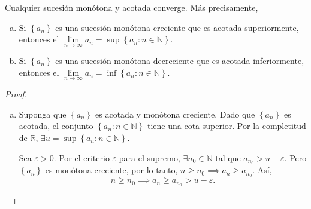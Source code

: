 \begin{frame}
  \begin{theorem}
    Cualquier sucesión monótona y acotada \alert{converge}.
    Más precisamente,

    \begin{enumerate}[a)]
      \item

            Si $\left\{a_{n}\right\}$ es una sucesión monótona
            creciente que es acotada superiormente, entonces el
            \begin{math}
              \lim\limits_{n\to\infty}a_{n}=
              \sup\left\{a_{n}:n\in\mathbb{N}\right\}
            \end{math}.

      \item

            Si $\left\{a_{n}\right\}$ es una sucesión monótona
            decreciente que es acotada inferiormente, entonces el
            \begin{math}
              \lim\limits_{n\to\infty}a_{n}=
              \inf\left\{a_{n}:n\in\mathbb{N}\right\}
            \end{math}.
    \end{enumerate}
  \end{theorem}

  \begin{proof}
    \begin{enumerate}[a)]
      \item

            Suponga que $\left\{a_{n}\right\}$ es acotada y monótona
            creciente.
            Dado que $\left\{a_{n}\right\}$ es acotada, el conjunto
            $\left\{a_{n}:n\in\mathbb{N}\right\}$ tiene una cota
            superior.
            Por la completitud de $\mathbb{R}$,
            \begin{math}
              \exists u=
              \sup\left\{a_{n}:n\in\mathbb{N}\right\}
            \end{math}.

            Sea $\varepsilon>0$.
            Por el criterio $\varepsilon$ para el supremo,
            $\exists n_{0}\in\mathbb{N}$ tal que $a_{n_{0}}>u-\varepsilon$.
            Pero $\left\{a_{n}\right\}$ es monótona creciente, por lo tanto,
            $n\geq n_{0}\implies a_{n}\geq a_{n_{0}}$.
            Así,
            \begin{equation}\label{eq:increasing}
              n\geq n_{0}\implies a_{n}\geq a_{n_{0}}>u-\varepsilon.
            \end{equation}


\end{enumerate}
\end{proof}
\end{frame}

